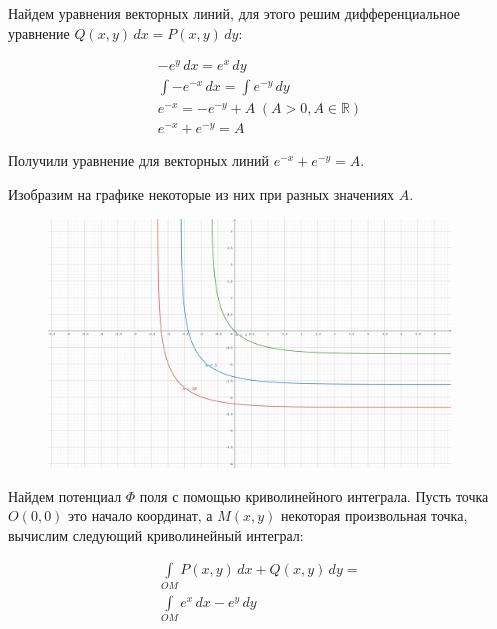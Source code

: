 \bigskip

Найдем уравнения векторных линий, для этого решим дифференциальное уравнение
\(Q(x, y)\,dx = P(x, y)\,dy\):

\begin{equation*}\begin{split}
    -e^y\,dx = e^x\,dy \\
    \int -e^{-x}\,dx = \int e^{-y}\,dy \\
    e^{-x} = -e^{-y} + A \hspace{3pt} (A > 0, A \in \mathbb{R})\\
    e^{-x} + e^{-y} = A
  \end{split}\end{equation*}

Получили уравнение для векторных линий \(e^{-x} + e^{-y} = A\).

Изобразим на графике некоторые из них при разных значениях \(A\).

\begin{figure}[!htbp]
  \centering
  \includegraphics[width=0.95\textwidth]{images/t02_p01.png}
\end{figure}

\bigskip

Найдем потенциал \(\Phi\) поля с помощью криволинейного интеграла. Пусть точка
\(O(0, 0)\) это начало координат, а \(M(x, y)\) некоторая произвольная точка,
вычислим следующий криволинейный интеграл:

\begin{equation*}\begin{split}
    \int\limits_{OM} P(x, y)\,dx + Q(x, y)\,dy = \\
    \int\limits_{OM} e^x \,dx - e^y \,dy
  \end{split}\end{equation*}

